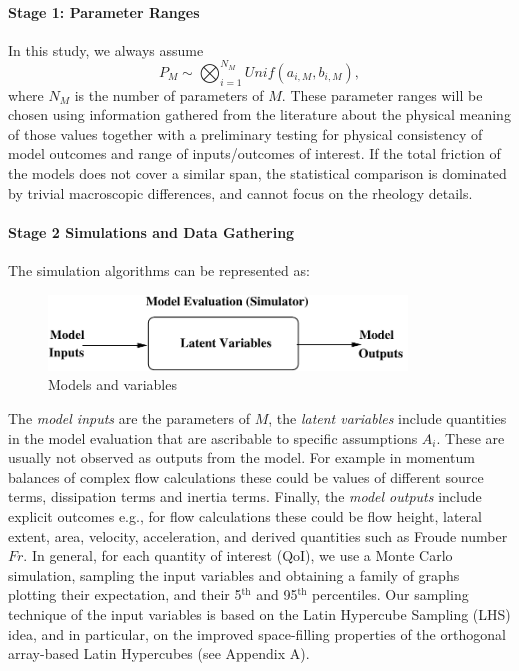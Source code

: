 \documentclass{article}
\begin{document}
\paragraph{Stage 1: Parameter Ranges} In this study, we always assume
$$P_M\sim \bigotimes_{i=1}^{N_M} Unif(a_{i,M},b_{i,M}),$$
where $N_M$ is the number of parameters of $M$. These parameter ranges will be chosen using information gathered from the literature about the physical meaning of those values together with a preliminary testing for physical consistency of model outcomes and range of inputs/outcomes of interest. If the total friction of the models does not cover a similar span, the statistical comparison is dominated by trivial macroscopic differences, and cannot focus on the rheology details.

\paragraph{Stage 2 Simulations and Data Gathering}
The simulation algorithms can be represented as:
\begin{figure}[H]
\centerline{\includegraphics[width=0.85\textwidth]{modelproc.pdf}}
\centering
\caption{Models and variables}
\end{figure}


The \emph{model inputs} are the parameters of $M$, the \emph{latent variables} include quantities in the model evaluation that are ascribable to specific assumptions $A_i$. These are usually not observed as outputs from the model. For example in momentum balances of complex flow calculations these could be values of different source terms, dissipation terms and inertia terms. Finally, the \emph{model outputs}  include explicit outcomes e.g., for flow calculations these could be  flow height, lateral extent, area, velocity, acceleration, and derived quantities such as Froude number $Fr$. In general, for each  quantity of interest (QoI), we use a Monte Carlo simulation, sampling the input variables and obtaining a family of  graphs  plotting their expectation, and their 5$^{\mathrm{th}}$ and 95$^{\mathrm{th}}$ percentiles. Our sampling technique of the input variables is based on the Latin Hypercube Sampling (LHS) idea, and in particular, on the improved space-filling properties of the orthogonal array-based Latin Hypercubes (see Appendix A).
\end{document}
